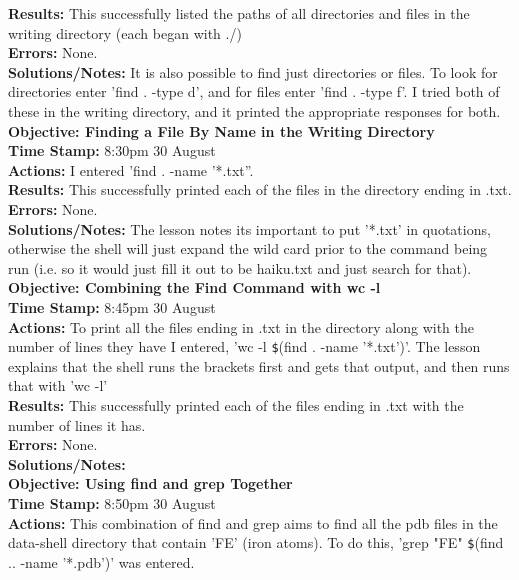 \documentclass{article}
\begin{document}
\begin{FlushLeft}
\textbf{Results:} This successfully listed the paths of all directories and files in the writing directory (each began with ./) \\
\textbf{Errors:} None. \\
\textbf{Solutions/Notes:} It is also possible to find just directories or files. To look for directories enter 'find . -type d', and for files enter 'find . -type f'. I tried both of these in the writing directory, and it printed the appropriate responses for both. \\
\vspace{5mm}
\textbf{Objective: Finding a File By Name in the Writing Directory}\\ 
\textbf{Time Stamp:} 8:30pm 30 August\\
\textbf{Actions:} I entered 'find . -name '*.txt''.\\
\textbf{Results:} This successfully printed each of the files in the directory ending in .txt.\\
\textbf{Errors:} None. \\
\textbf{Solutions/Notes:} The lesson notes its important to put '*.txt' in quotations, otherwise the shell will just expand the wild card prior to the command being run (i.e. so it would just fill it out to be haiku.txt and just search for that).\\
\vspace{5mm}
\textbf{Objective: Combining the Find Command with wc -l}\\ 
\textbf{Time Stamp:} 8:45pm 30 August\\
\textbf{Actions:} To print all the files ending in .txt in the directory along with the number of lines they have I entered, 'wc -l \verb|$|(find . -name '*.txt')'. The lesson explains that the shell runs the brackets first and gets that output, and then runs that with 'wc -l' \\
\textbf{Results:} This successfully printed each of the files ending in .txt with the number of lines it has. \\
\textbf{Errors:} None.\\
\textbf{Solutions/Notes:}\\
\vspace{5mm}
\textbf{Objective: Using find and grep Together}\\ 
\textbf{Time Stamp:} 8:50pm 30 August\\
\textbf{Actions:} This combination of find and grep aims to find all the pdb files in the data-shell directory that contain 'FE' (iron atoms). To do this, 'grep "FE" \verb|$|(find .. -name '*.pdb')' was entered.\\

\end{FlushLeft}
\end{document}
